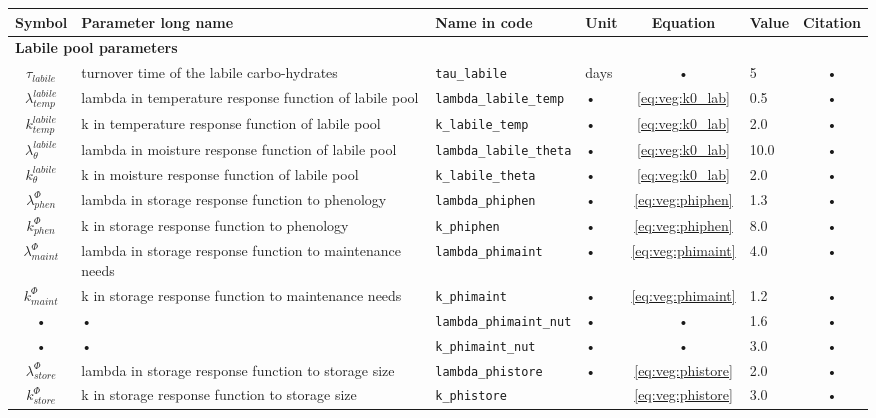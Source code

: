 \begin{table}
\begin{tabularx}{\linewidth}{|c|X|l|l|c|l|c|} %
\hline 
Symbol & Parameter long name & Name in code & Unit & Equation & Value & Citation \\ 
\hline 

\multicolumn{6}{l}{\bf Labile pool parameters}\\
\hline
$\tau_{labile}$ & turnover time of the labile carbo-hydrates & \texttt{tau\_labile} & days & • & 5 & • \\ 
$\lambda^{labile}_{temp}$ & lambda in temperature response function of labile pool & \texttt{lambda\_labile\_temp} & • & \ref{eq:veg:k0_lab} & 0.5 & • \\ 
$k^{labile}_{temp}$ & k in temperature response function of labile pool & \texttt{k\_labile\_temp} & • & \ref{eq:veg:k0_lab} & 2.0 & • \\ 
$\lambda^{labile}_{\theta}$ & lambda in moisture response function of labile pool & \texttt{lambda\_labile\_theta} & • & \ref{eq:veg:k0_lab} & 10.0 & • \\ 
$k^{labile}_{\theta}$ & k in moisture response function of labile pool & \texttt{k\_labile\_theta} & • & \ref{eq:veg:k0_lab} & 2.0 & • \\ 
$\lambda^{\Phi}_{phen}$ & lambda in storage response function to phenology & \texttt{lambda\_phiphen} & • & \ref{eq:veg:phiphen} & 1.3 & • \\ 
$k^{\Phi}_{phen}$ & k in storage response function to phenology & \texttt{k\_phiphen} & • & \ref{eq:veg:phiphen} & 8.0 & • \\ 
$\lambda^{\Phi}_{maint}$ & lambda in storage response function to maintenance needs & \texttt{lambda\_phimaint} & • & \ref{eq:veg:phimaint} & 4.0 & • \\ 
$k^{\Phi}_{maint}$ & k in storage response function to maintenance needs & \texttt{k\_phimaint} & • & \ref{eq:veg:phimaint} & 1.2 & • \\ 
• & • & \texttt{lambda\_phimaint\_nut} & • & • & 1.6 & • \\ 
• & • & \texttt{k\_phimaint\_nut} & • & • & 3.0 & • \\ 
$\lambda^{\Phi}_{store}$ & lambda in storage response function to storage size & \texttt{lambda\_phistore} & • & \ref{eq:veg:phistore} & 2.0 & • \\ 
$k^{\Phi}_{store}$ & k in storage response function to storage size & \texttt{k\_phistore} & & \ref{eq:veg:phistore} & 3.0 & • \\ 

\end{tabularx}
\end{table}
